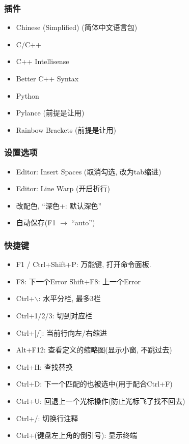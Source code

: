 \subsubsection{插件}

\begin{itemize}
	\item Chinese (Simplified) (简体中文语言包)
	\item C/C++
	\item C++ Intellisense
	\item Better C++ Syntax
	\item Python
	\item Pylance (前提是让用)
	\item Rainbow Brackets (前提是让用)
\end{itemize}

\subsubsection{设置选项}

\begin{itemize}
	\item Editor: Insert Spaces (取消勾选, 改为tab缩进)
	\item Editor: Line Warp (开启折行)
	\item 改配色, ``深色+: 默认深色''
	\item 自动保存(F1 $\rightarrow$ ``auto'')
\end{itemize}

\subsubsection{快捷键}

\begin{itemize}
	\item F1 / Ctrl+Shift+P: 万能键, 打开命令面板.
	\item F8: 下一个Error  Shift+F8: 上一个Error
	\item Ctrl+$\backslash$: 水平分栏, 最多3栏
	\item Ctrl+1/2/3: 切到对应栏
	\item Ctrl+[/]: 当前行向左/右缩进
	\item Alt+F12: 查看定义的缩略图(显示小窗, 不跳过去)
	\item Ctrl+H: 查找替换
	\item Ctrl+D: 下一个匹配的也被选中(用于配合Ctrl+F)
	\item Ctrl+U: 回退上一个光标操作(防止光标飞了找不回去)
	\item Ctrl+/: 切换行注释
	\item Ctrl+(键盘左上角的倒引号): 显示终端
\end{itemize}